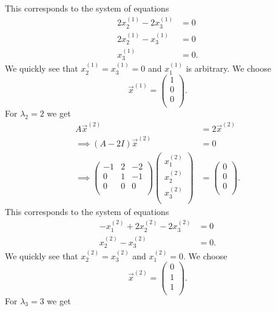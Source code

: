 This corresponds to the system of equations
\begin{align*}
  2x_2^{(1)} - 2x_3^{(1)} &= 0 \\
  2x_2^{(1)} - x_3^{(1)} &= 0 \\
  x_3^{(1)} &= 0
.\end{align*}
We quickly see that $x_2^{(1)} = x_3^{(1)} = 0$ and $x_1^{(1)}$ is arbitrary. We choose
\[ 
\Vec{x}^{(1)} = \begin{pmatrix}
1\\
0\\
0\\
\end{pmatrix}
.\]
For $\lambda_2 = 2$ we get
\begin{align*}
  A \Vec{x}^{(2)} &= 2 \Vec{x}^{(2)} \\
  \implies (A - 2I)\Vec{x}^{(2)} &= 0 \\
  \implies \begin{pmatrix}
  -1 & 2 & -2\\
  0 & 1 & -1\\
  0 & 0 & 0\\
  \end{pmatrix} \begin{pmatrix}
  x_1^{(2)}\\
  x_2^{(2)}\\
  x_3^{(2)}\\
  \end{pmatrix} &= \begin{pmatrix}
  0\\
  0\\
  0\\
  \end{pmatrix}
.\end{align*}
This corresponds to the system of equations
\begin{align*}
  -x_1^{(2)} + 2x_2^{(2)} -2x_3^{(2)} &= 0 \\
  x_2^{(2)} - x_3^{(2)} &= 0
.\end{align*}
We quickly see that $x_2^{(2)} = x_3^{(2)}$ and $x_1^{(2)} = 0$. We choose
\[ 
\Vec{x}^{(2)} = \begin{pmatrix}
0\\
1\\
1\\
\end{pmatrix}
.\]
For $\lambda_3 = 3$ we get
